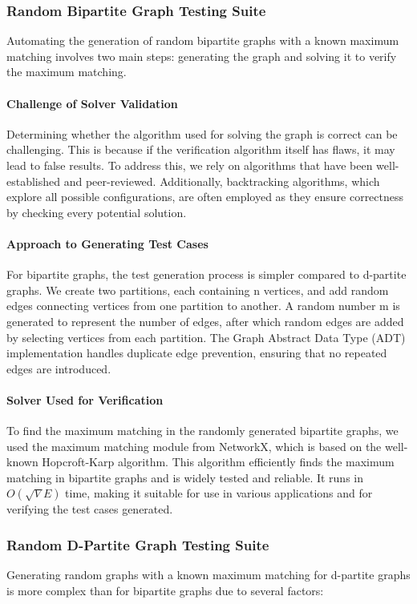 \subsubsection{Random Bipartite Graph Testing Suite}
Automating the generation of random bipartite graphs with a known maximum matching involves two main steps: generating the graph and solving it to verify the maximum matching. 

\paragraph{Challenge of Solver Validation}
Determining whether the algorithm used for solving the graph is correct can be challenging. This is because if the verification algorithm itself has flaws, it may lead to false results. To address this, we rely on algorithms that have been well-established and peer-reviewed. Additionally, backtracking algorithms, which explore all possible configurations, are often employed as they ensure correctness by checking every potential solution.

\paragraph{Approach to Generating Test Cases}
For bipartite graphs, the test generation process is simpler compared to d-partite graphs. We create two partitions, each containing n vertices, and add random edges connecting vertices from one partition to another. A random number m is generated to represent the number of edges, after which random edges are added by selecting vertices from each partition. The Graph Abstract Data Type (ADT) implementation handles duplicate edge prevention, ensuring that no repeated edges are introduced.

\paragraph{Solver Used for Verification}
To find the maximum matching in the randomly generated bipartite graphs, we used the maximum matching module from NetworkX, which is based on the well-known Hopcroft-Karp algorithm. This algorithm efficiently finds the maximum matching in bipartite graphs and is widely tested and reliable. It runs in $O(\sqrt{V}E)$ time, making it suitable for use in various applications and for verifying the test cases generated.

\subsubsection{Random D-Partite Graph Testing Suite}
Generating random graphs with a known maximum matching for d-partite graphs is more complex than for bipartite graphs due to several factors:

